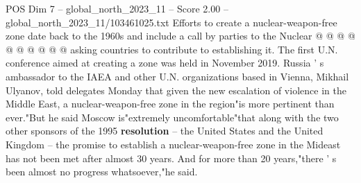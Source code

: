 \begin{textsample}{POS Dim 7 – global\_north\_2023\_11 – Score 2.00 – global\_north\_2023\_11/103461025.txt}
Efforts to create a nuclear-weapon-free zone date back to the 1960s and include a call by parties to the Nuclear @ @ @ @ @ @ @ @ @ @ asking countries to contribute to establishing it.
The first U.N. conference aimed at creating a zone was held in November 2019.
Russia ' s ambassador to the IAEA and other U.N. organizations based in Vienna, Mikhail Ulyanov, told delegates Monday that given the new escalation of violence in the Middle East, a nuclear-weapon-free zone in the region"is more pertinent than ever."But he said Moscow is"extremely uncomfortable"that along with the two other sponsors of the 1995 \textbf{resolution} -- the United States and the United Kingdom -- the promise to establish a nuclear-weapon-free zone in the Mideast has not been met after almost 30 years.
And for more than 20 years,"there ' s been almost no progress whatsoever,"he said.

\end{textsample}
